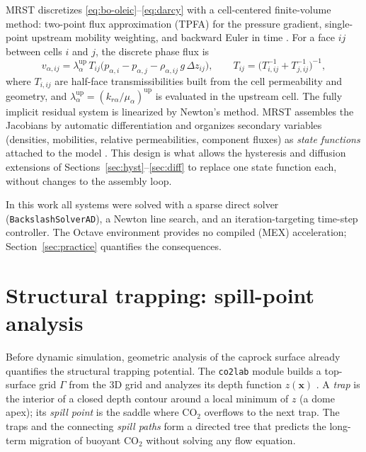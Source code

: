 \documentclass[preprint,11pt]{elsarticle}
\begin{document}
MRST discretizes \eqref{eq:bo-oleic}--\eqref{eq:darcy} with a
cell-centered finite-volume method: two-point flux approximation (TPFA)
for the pressure gradient, single-point upstream mobility weighting, and
backward Euler in time \cite{lie2019}. For a face $ij$ between cells $i$
and $j$, the discrete phase flux is
\begin{equation}
v_{\alpha,ij} = \lambda_{\alpha}^{\mathrm{up}}\, T_{ij}
\big(p_{\alpha,i} - p_{\alpha,j} - \rho_{\alpha,ij}\, g\, \Delta z_{ij}\big),
\qquad
T_{ij} = \Big(T_{i,ij}^{-1} + T_{j,ij}^{-1}\Big)^{-1},
\label{eq:tpfa}
\end{equation}
where $T_{i,ij}$ are half-face transmissibilities built from the cell
permeability and geometry, and
$\lambda_\alpha^{\mathrm{up}} = (k_{r\alpha}/\mu_\alpha)^{\mathrm{up}}$
is evaluated in the upstream cell. The fully implicit residual system is
linearized by Newton's method. MRST assembles the Jacobians by automatic
differentiation and organizes secondary variables (densities, mobilities,
relative permeabilities, component fluxes) as \emph{state functions}
attached to the model \cite{lie-moyner2021}. This design is what allows
the hysteresis and diffusion extensions of
Sections~\ref{sec:hyst}--\ref{sec:diff} to replace one state function
each, without changes to the assembly loop.

In this work all systems were solved with a sparse direct solver
(\texttt{BackslashSolverAD}), a Newton line search, and an
iteration-targeting time-step controller. The Octave environment provides
no compiled (MEX) acceleration; Section~\ref{sec:practice} quantifies the
consequences.

\section{Structural trapping: spill-point analysis}
\label{sec:trapping}

Before dynamic simulation, geometric analysis of the caprock surface
already quantifies the structural trapping potential. The
\texttt{co2lab} module builds a top-surface grid $\Gamma$ from the 3D
grid and analyzes its depth function $z(\mathbf{x})$
\cite{nilsen2015}. A \emph{trap} is the interior of a closed depth
contour around a local minimum of $z$ (a dome apex); its \emph{spill
point} is the saddle where CO$_2$ overflows to the next trap. The traps
and the connecting \emph{spill paths} form a directed tree that predicts
the long-term migration of buoyant CO$_2$ without solving any flow
equation.
\end{document}
